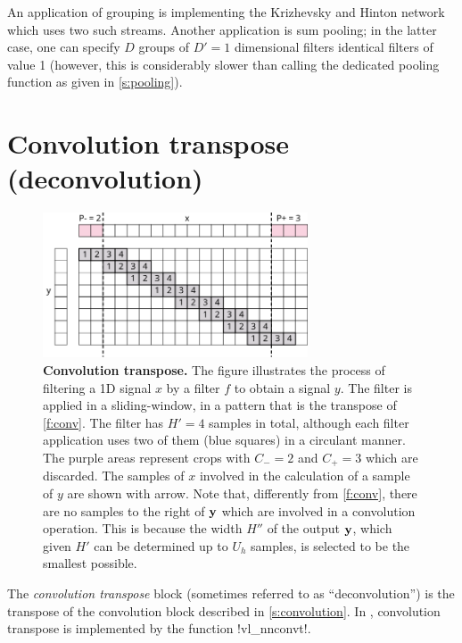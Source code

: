 An application of grouping is implementing the Krizhevsky and Hinton network~\cite{krizhevsky12imagenet} which uses two such streams. Another application is sum pooling; in the latter case, one can specify $D$ groups of $D'=1$ dimensional filters identical filters of value 1 (however, this is considerably slower than calling the dedicated pooling function as given in \cref{s:pooling}).

\section{Convolution transpose (deconvolution)}\label{s:convt}

\begin{figure}[t]
	\centering
	\includegraphics[width=0.7\textwidth]{figures/svg/convt}
	\caption{\textbf{Convolution transpose.} The figure illustrates the process of filtering a 1D signal $x$ by a filter $f$ to obtain a signal $y$. The filter is applied in a sliding-window, in a pattern that is the transpose of \cref{f:conv}. The filter has $H'=4$ samples in total, although each filter application uses two of them (blue squares) in a circulant manner. The purple areas represent crops with $C_-=2$ and $C_+=3$ which are discarded.  The samples of $x$ involved in the calculation of a sample of $y$ are shown with arrow. Note that, differently from \cref{f:conv}, there are no samples to the right of $\mathbf{y}$ which are involved in a convolution operation. This is because the width $H''$ of the output $\mathbf{y}$, which given $H'$ can be determined up to $U_h$ samples, is selected to be the smallest possible.}\label{f:convt}
\end{figure}

The \emph{convolution transpose} block (sometimes referred to as ``deconvolution'') is the transpose of the convolution block described in \cref{s:convolution}. In \matconvnet, convolution transpose is  implemented by the function !vl_nnconvt!. 


